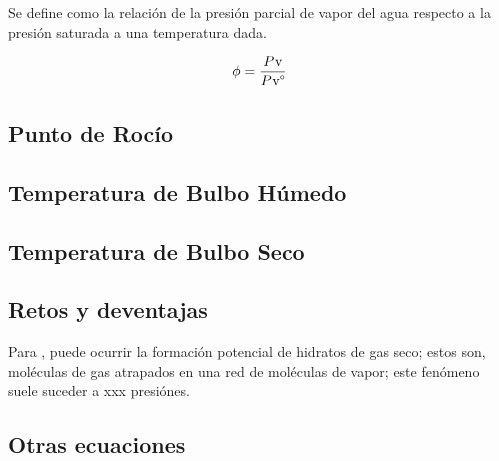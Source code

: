 Se define como la relación de la presión parcial de vapor del agua respecto a la presión saturada a una temperatura dada.

\begin{equation}
  \eqRelativeHumidityFst{\RelativeHumidity}
\end{equation}

\subsection{Punto de Rocío}
\subsection{Temperatura de Bulbo Húmedo}
\subsection{Temperatura de Bulbo Seco}



\subsection{Retos y deventajas}
Para \parencite[p. 8]{Bell2017}, puede ocurrir la formación potencial de hidratos de gas seco; estos son, moléculas de gas atrapados en una red de moléculas de vapor; este fenómeno suele suceder a xxx presiónes.
\subsection{Otras ecuaciones}


